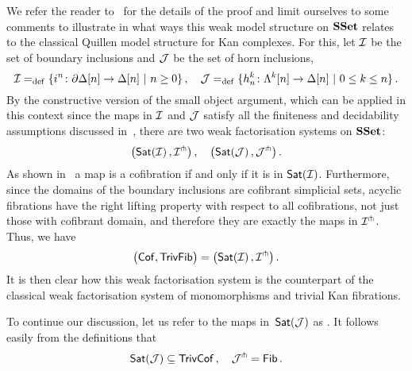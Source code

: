 \documentclass[reqno,10pt,a4paper,oneside,draft]{amsart}
\begin{document}
We refer the reader to~\cite{henry2018wms} for the details of the proof and limit ourselves to some comments to illustrate in what ways this weak model structure on $\SSet$ relates to the classical Quillen model structure for Kan complexes. 
For this, let $\cal{I}$ be the set of boundary inclusions and $\cal{J}$ be the set of horn inclusions, \ie
\[
\cal{I} \defeq \{ i^n \co  \partial \Delta[n] \to \Delta[n] \ | \ n \geq 0 \} \, , \quad 
\cal{J} \defeq \{ h^k_n  \co \Lambda^k[n] \to \Delta[n]  \ | \ 0 \leq k \leq n \} \, .
\]
By the constructive version of the small object argument, which can be applied in this context since the 
maps in $\cal{I}$ and $\cal{J}$ satisfy all the finiteness and decidability assumptions discussed 
in~\cite{henry2018wms}, there are two weak factorisation systems on $\SSet$: 
\begin{equation}
\label{equ:wfs}
\big( \mathsf{Sat}(\cal{I}) \, , \cal{I}^\pitchfork \big) \, , \quad 
\big( \mathsf{Sat}(\cal{J}) \, , \cal{J}^\pitchfork \big) \, .
\end{equation}
As shown in~\cite[Proposition 5.1.7]{henry2018wms} a map is a cofibration if and only if it is in $\mathsf{Sat}(\cal{I})$. Furthermore, since the domains of the boundary inclusions are cofibrant simplicial sets, acyclic fibrations have the right lifting property with respect to all cofibrations, not just those with cofibrant domain, and therefore they are exactly the maps in $\cal{I}^\pitchfork$. Thus, we have
\[
\big( \Cof, \TrivFib \big) = \big( \mathsf{Sat}(\cal{I}) \, , \cal{I}^\pitchfork \big) \, .
\]
It is then clear how this weak factorisation system is the counterpart of the classical weak factorisation system of monomorphisms and trivial Kan fibrations. 

To continue our discussion, let us refer to the maps in~$\mathsf{Sat}(\cal{J})$ as . It follows easily from the definitions that 
\[
  \mathsf{Sat}(\cal{J}) \subseteq \TrivCof \, , \quad \cal{J}^\pitchfork = \Fib \, .
\]



\medskip 




\bigskip



\end{document}
